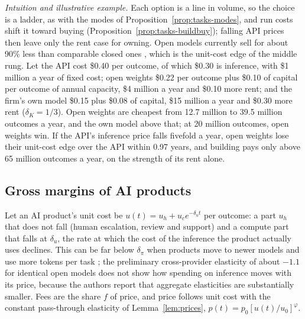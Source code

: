 \noindent\emph{Intuition and illustrative example.} Each option is a line in volume, so the choice is a ladder, as with the modes of Proposition~\ref{prop:tasks-modes}, and run costs shift it toward buying (Proposition~\ref{prop:tasks-buildbuy}); falling API prices then leave only the rent case for owning. Open models currently sell for about 90\% less than comparable closed ones \citep{demirer2025emerging}, which is the unit-cost edge of the middle rung. Let the API cost \$0.40 per outcome, of which \$0.30 is inference, with \$1 million a year of fixed cost; open weights \$0.22 per outcome plus \$0.10 of capital per outcome of annual capacity, \$4 million a year and \$0.10 more rent; and the firm's own model \$0.15 plus \$0.08 of capital, \$15 million a year and \$0.30 more rent ($\delta_K=1/3$). Open weights are cheapest from 12.7 million to 39.5 million outcomes a year, and the own model above that; at 20 million outcomes, open weights win. If the API's inference price falls fivefold a year, open weights lose their unit-cost edge over the API within 0.97 years, and building pays only above 65 million outcomes a year, on the strength of its rent alone.

\subsection{Gross margins of AI products}\label{sec:product-margin}

Let an AI product's unit cost be $u(t)=u_h+u_ce^{-\delta_ut}$ per outcome: a part $u_h$ that does not fall (human escalation, review and support) and a compute part that falls at $\delta_u$, the rate at which the cost of the inference the product actually uses declines. This can be far below $\delta_\pi$ when products move to newer models and use more tokens per task \citep{gundlach2025price}; the preliminary cross-provider elasticity of about $-1.1$ for identical open models \citep{demirer2025emerging} does not show how spending on inference moves with its price, because the authors report that aggregate elasticities are substantially smaller. Fees are the share $f$ of price, and price follows unit cost with the constant pass-through elasticity of Lemma~\ref{lem:prices}, $p(t)=p_0[u(t)/u_0]^{\varphi}$.

